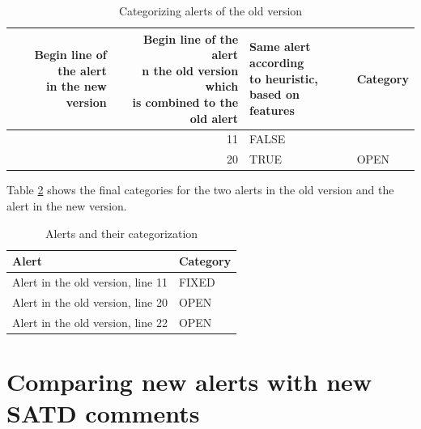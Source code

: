 \documentclass[
]{article}
\begin{document}
\begin{table}[H]

\caption{\label{tab:unnamed-chunk-16}Categorizing alerts of the old version \label{tab_categorizing_new} }
\centering
\begin{tabular}[t]{r|r|l|l}
\hline
\makecell[l]{Begin line of the alert\\in the new version} & \makecell[l]{Begin line of the alert\\n the old version which\\is combined to the old alert} & \makecell[l]{Same alert according\\to heuristic,\\ based on features} & Category\\
\hline
\rowcolor{gray!6}   & 11 & FALSE & \\

\multirow[t]{-2}{*}{\raggedleft\arraybackslash 22} & 20 & TRUE & \multirow[t]{-2}{*}{\raggedright\arraybackslash OPEN}\\
\hline
\end{tabular}
\end{table}

\normalsize

Table \ref{tab_summary_categories} shows the final categories for the
two alerts in the old version and the alert in the new version.

\small

\begin{table}[H]

\caption{\label{tab:unnamed-chunk-17}Alerts and their categorization\label{tab_summary_categories} }
\centering
\begin{tabular}[t]{l|l}
\hline
Alert & Category\\
\hline
\rowcolor{gray!6}  Alert in the old version, line 11 & FIXED\\
\hline
Alert in the old version, line 20 & OPEN\\
\hline
\rowcolor{gray!6}  Alert in the old version, line 22 & OPEN\\
\hline
\end{tabular}
\end{table}

\normalsize

\section{Comparing new alerts with new SATD comments}\label{results}
\end{document}
